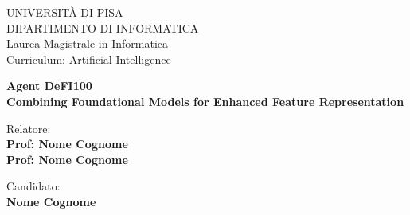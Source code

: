 \begin{titlepage}
\begin{figure}[!htb]
    \centering
\end{figure}

\begin{center}
    \LARGE{UNIVERSITÀ DI PISA}
    \vspace{5mm}
    \\ \large{DIPARTIMENTO DI INFORMATICA}
    \vspace{5mm}
    \\ \LARGE{Laurea Magistrale in Informatica}
    \\ \LARGE{Curriculum: Artificial Intelligence}
\end{center}

\vspace{7mm}
\begin{center}
    {\LARGE{\bf Agent DeFI100\\ \vspace{5mm}
            Combining Foundational Models for Enhanced Feature Representation }}
    
    
\end{center}
\vspace{30mm}

\begin{minipage}[t]{0.47\textwidth}
	{\large{Relatore:}{\normalsize\vspace{3mm}
	\bf\\ \large{Prof: Nome Cognome} \normalsize\vspace{3mm}\bf \\ \large{Prof: Nome Cognome}}}
\end{minipage}
\hfill
\begin{minipage}[t]{0.47\textwidth}\raggedleft
	{\large{Candidato:}{\normalsize\vspace{3mm} \bf\\ \large{Nome Cognome}}}
\end{minipage}

\vspace{30mm}
\hrulefill
\\

\end{titlepage}